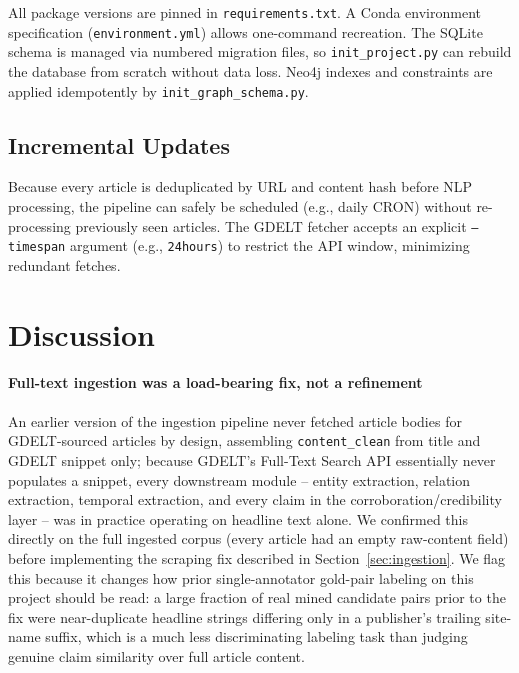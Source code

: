 \documentclass[conference]{IEEEtran}
\begin{document}
All package versions are pinned in \texttt{requirements.txt}. A Conda
environment specification (\texttt{environment.yml}) allows one-command
recreation. The SQLite schema is managed via numbered migration files, so
\texttt{init\_project.py} can rebuild the database from scratch without
data loss. Neo4j indexes and constraints are applied idempotently by
\texttt{init\_graph\_schema.py}.

\subsection{Incremental Updates}

Because every article is deduplicated by URL and content hash before NLP
processing, the pipeline can safely be scheduled (e.g., daily CRON) without
re-processing previously seen articles. The GDELT fetcher accepts an
explicit \texttt{--timespan} argument (e.g., \texttt{24hours}) to restrict
the API window, minimizing redundant fetches.

\section{Discussion}
\label{sec:discussion}

\paragraph{Full-text ingestion was a load-bearing fix, not a refinement}
An earlier version of the ingestion pipeline never fetched article bodies
for GDELT-sourced articles by design, assembling \texttt{content\_clean}
from title and GDELT snippet only; because GDELT's Full-Text Search API
essentially never populates a snippet, every downstream module -- entity
extraction, relation extraction, temporal extraction, and every claim in
the corroboration/credibility layer -- was in practice operating on
headline text alone. We confirmed this directly on the full ingested
corpus (every article had an empty raw-content field) before implementing
the scraping fix described in Section~\ref{sec:ingestion}. We flag this
because it changes how prior single-annotator gold-pair labeling on this
project should be read: a large fraction of real mined candidate pairs
prior to the fix were near-duplicate headline strings differing only in a
publisher's trailing site-name suffix, which is a much less discriminating
labeling task than judging genuine claim similarity over full article
content.
\end{document}
